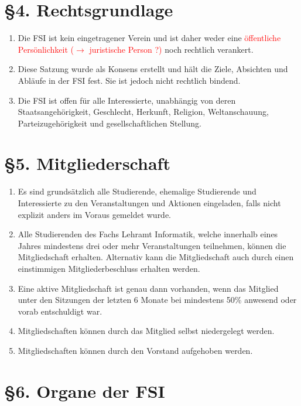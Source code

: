 \documentclass[a4paper,12pt]{article}
\newcommand{\red}[1]{\textcolor{red}{#1}}
\begin{document}
\section*{§4. Rechtsgrundlage}

\begin{enumerate}
	\item
		Die FSI ist kein eingetragener Verein und ist daher weder eine \red{
		öffentliche Persönlichkeit ($\rightarrow$ juristische Person ?)} noch rechtlich verankert.
	\item
		Diese Satzung wurde als Konsens erstellt und hält die Ziele,
		Absichten und Abläufe in der FSI fest. Sie ist jedoch nicht
		rechtlich bindend.
    	\item
		Die FSI ist offen für alle Interessierte, unabhängig von deren
		Staatsangehörigkeit, Geschlecht, Herkunft, Religion,
		Weltanschauung, Parteizugehörigkeit und gesellschaftlichen
		Stellung.
\end{enumerate}

\section*{§5. Mitgliederschaft}

\begin{enumerate}
	\item
		Es sind grundsätzlich alle Studierende, ehemalige Studierende
		und Interessierte zu den Veranstaltungen und Aktionen
		eingeladen, falls nicht explizit anders im Voraus gemeldet
		wurde.
    	\item
		Alle Studierenden des Fachs Lehramt Informatik, welche innerhalb
		eines Jahres mindestens drei oder mehr Veranstaltungen
		teilnehmen, können die Mitgliedschaft erhalten. Alternativ kann
		die Mitgliedschaft auch durch einen einstimmigen
		Mitgliederbeschluss erhalten werden.
	\item
		Eine aktive Mitgliedschaft ist genau dann vorhanden, wenn das
		Mitglied unter den Sitzungen der letzten 6 Monate bei mindestens
		50\% anwesend oder vorab entschuldigt war.
	\item
		Mitgliedschaften können durch das Mitglied selbst niedergelegt
		werden.
	\item 	Mitgliedschaften können durch den Vorstand aufgehoben werden.
\end{enumerate}

\section*{§6. Organe der FSI}
\end{document}
